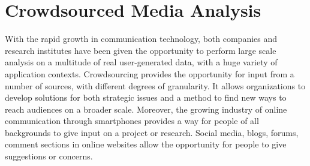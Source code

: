 \chapter{Crowdsourced Media Analysis}\label{ch2}
With the rapid growth in communication technology, both companies and research institutes have been given the opportunity to perform large scale analysis on a multitude of real user-generated data, with a huge variety of application contexts.
Crowdsourcing provides the opportunity for input from a number of sources, with different degrees of granularity. It allows organizations to develop solutions for both strategic issues and a method to find new ways to reach audiences on a broader scale. Moreover, the growing industry of online communication through smartphones provides a way for people of all backgrounds to give input on a project or research.
Social media, blogs, forums, comment sections in online websites allow the opportunity for people to give suggestions or concerns.

